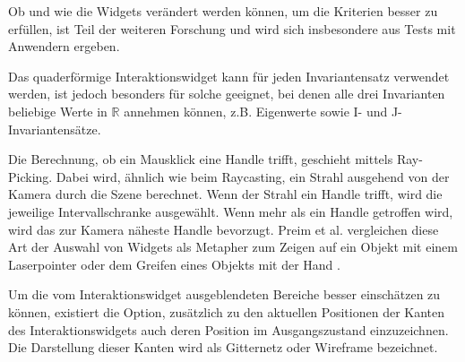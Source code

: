 \documentclass[a4paper,fontsize=12pt,toc=bib,parskip=half,ngerman]{scrartcl}
\begin{document}
Ob und wie die Widgets ver\"andert werden k\"onnen, um die Kriterien besser zu erf\"ullen, ist Teil der weiteren Forschung und wird sich insbesondere aus Tests mit Anwendern ergeben.

Das quaderf\"ormige Interaktionswidget kann f\"ur jeden Invariantensatz verwendet werden, ist jedoch besonders f\"ur solche geeignet, bei denen alle drei Invarianten beliebige Werte in $\mathbb{R}$ annehmen k\"onnen, z.B. Eigenwerte sowie I- und J-Invariantens\"atze.

Die Berechnung, ob ein Mausklick eine Handle trifft, geschieht mittels \glq Ray-Picking\grq{}. Dabei wird, \"ahnlich wie beim Raycasting, ein Strahl ausgehend von der Kamera durch die Szene berechnet. Wenn der Strahl ein Handle trifft, wird die jeweilige Intervallschranke ausgew\"ahlt.  Wenn mehr als ein Handle getroffen wird, wird das zur Kamera n\"aheste Handle bevorzugt. Preim et al. vergleichen diese Art der Auswahl von Widgets als Metapher zum Zeigen auf ein Objekt mit einem Laserpointer oder dem Greifen eines Objekts mit der Hand \cite[344]{preim2015interaktive}.

Um die vom Interaktionswidget ausgeblendeten Bereiche besser einsch\"atzen zu k\"onnen, existiert die Option, zus\"atzlich zu den aktuellen Positionen der Kanten des Interaktionswidgets auch deren Position im Ausgangszustand einzuzeichnen. Die Darstellung dieser Kanten wird als Gitternetz oder \glq Wireframe\grq{} bezeichnet.
\end{document}
